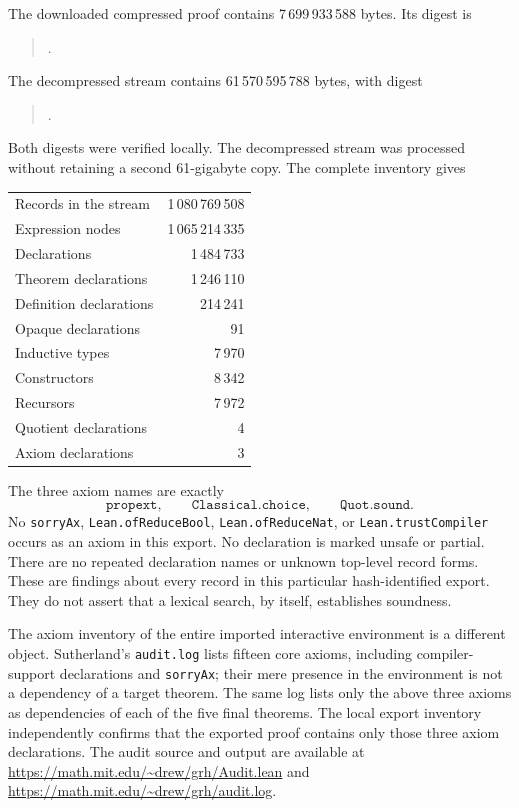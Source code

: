\documentclass[11pt,a4paper]{article}
\theoremstyle{remark}
\begin{document}
The downloaded compressed proof contains 7\,699\,933\,588 bytes.  Its digest is
\begin{quote}\small\ttfamily
{}.
\end{quote}
The decompressed stream contains 61\,570\,595\,788 bytes, with digest
\begin{quote}\small\ttfamily
{}.
\end{quote}
Both digests were verified locally.  The decompressed stream was processed
without retaining a second 61-gigabyte copy.  The complete inventory gives
\begin{center}
\begin{tabular}{lr}
Records in the stream & 1\,080\,769\,508\\
Expression nodes & 1\,065\,214\,335\\
Declarations & 1\,484\,733\\
Theorem declarations & 1\,246\,110\\
Definition declarations & 214\,241\\
Opaque declarations & 91\\
Inductive types & 7\,970\\
Constructors & 8\,342\\
Recursors & 7\,972\\
Quotient declarations & 4\\
Axiom declarations & 3
\end{tabular}
\end{center}
The three axiom names are exactly
\[
 \texttt{propext},\qquad \texttt{Classical.choice},\qquad
 \texttt{Quot.sound}.
\]
No \texttt{sorryAx}, \texttt{Lean.ofReduceBool},
\texttt{Lean.ofReduceNat}, or \texttt{Lean.trustCompiler} occurs as an axiom
in this export.  No declaration is marked unsafe or partial.  There are no
repeated declaration names or unknown top-level record forms.  These are
findings about every record in this particular hash-identified export.
They do not assert that a lexical search, by itself, establishes soundness.

The axiom inventory of the entire imported interactive environment is a
different object.  Sutherland's \texttt{audit.log} lists fifteen core axioms,
including compiler-support declarations and \texttt{sorryAx}; their mere
presence in the environment is not a dependency of a target theorem.  The
same log lists only the above three axioms as dependencies of each of the five
final theorems.  The local export inventory independently confirms that the
exported proof contains only those three axiom declarations.  The audit source
and output are available at
\url{https://math.mit.edu/~drew/grh/Audit.lean} and
\url{https://math.mit.edu/~drew/grh/audit.log}.
\end{document}
